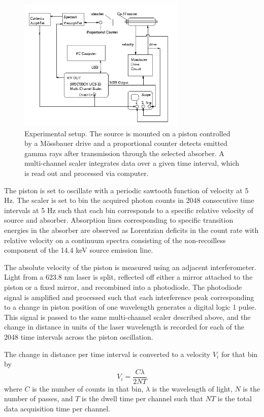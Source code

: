 \begin{figure}[htb]
\includegraphics[width=8cm]{setup.png}
\caption{Experimental setup. The source is mounted on a piston controlled by a M{\"o}ssbauer drive and a proportional counter detects emitted gamma rays after transmission through the selected absorber. A multi-channel scaler integrates data over a given time interval, which is read out and processed via computer. }
\label{fig:setup}
\end{figure} 

The piston is set to oscillate with a periodic sawtooth function of velocity at 5 Hz. The scaler is set to bin the acquired photon counts in 2048 consecutive time intervals at 5 Hz such that each bin corresponds to a specific relative velocity of source and absorber. Absorption lines corresponding to specific transition energies in the absorber are observed as Lorentzian deficits in the count rate with relative velocity on a continuum spectra consisting of the non-recoilless component of the 14.4 keV source emission line. 

The absolute velocity of the piston is measured using an adjacent interferometer. Light from a 623.8 nm laser is split, reflected off either a mirror attached to the piston or a fixed mirror, and recombined into a photodiode. The photodiode signal is amplified and processed such that each interference peak corresponding to a change in piston position of one wavelength generates a digital logic 1 pulse. This signal is passed to the same multi-channel scaler described above, and the change in distance in units of the laser wavelength is recorded for each of the 2048 time intervals across the piston oscillation.

The change in distance per time interval is converted to a velocity $V_i$ for that bin by
\begin{equation}
V_i = \frac{C\lambda}{2NT}
\label{eq:v}
\end{equation}
where $C$ is the number of counts in that bin, $\lambda$ is the wavelength of light, $N$ is the number of passes, and $T$ is the dwell time per channel such that $NT$ is the total data acquisition time per channel.

